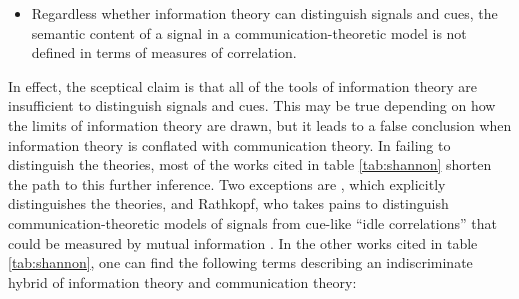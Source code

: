 \begin{itemize}
    \item Regardless whether information theory can distinguish signals and cues, the semantic content of a signal in a communication-theoretic model is not defined in terms of measures of correlation.
\end{itemize}

\noindent 
In effect, the sceptical claim is that all of the tools of information theory are insufficient to distinguish signals and cues.
This may be true depending on how the limits of information theory are drawn, but it leads to a false conclusion when information theory is conflated with communication theory.
In failing to distinguish the theories, most of the works cited in table \ref{tab:shannon} shorten the path to this further inference.
Two exceptions are \citet[17-20]{piccinini2011information}, which explicitly distinguishes the theories, and Rathkopf, who takes pains to distinguish communication-theoretic models of signals from cue-like ``idle correlations'' that could be measured by mutual information \citep[p. 324 passim]{rathkopf2017neural}.
In the other works cited in table \ref{tab:shannon}, one can find the following terms describing an indiscriminate hybrid of information theory and communication theory:

